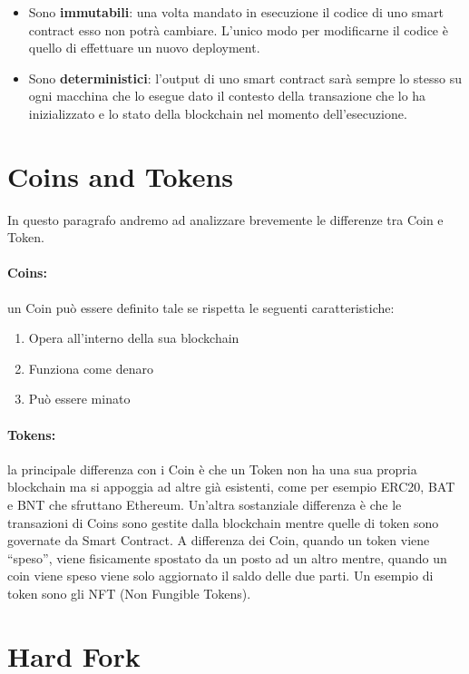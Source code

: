 \vspace{-0.5em}

\begin{itemize}
      \item Sono \textbf{immutabili}: una volta mandato in esecuzione il codice di uno smart contract esso non potrà cambiare. L'unico modo per modificarne il codice è quello di  effettuare un nuovo deployment.
      \item Sono \textbf{deterministici}: l'output di uno smart contract sarà sempre lo stesso su ogni macchina che lo esegue dato il contesto della transazione che lo ha inizializzato e lo stato della blockchain nel momento dell'esecuzione.
\end{itemize}

\section{Coins and Tokens}
In questo paragrafo andremo ad analizzare brevemente le differenze tra Coin e Token.

\paragraph{Coins:} un Coin può essere definito tale se rispetta le seguenti caratteristiche:

\begin{enumerate}
      \item Opera all'interno della sua blockchain
      \item Funziona come denaro
      \item Può essere minato
\end{enumerate}

\paragraph{Tokens:}
la principale differenza con i Coin è che un Token non ha una sua propria blockchain ma si appoggia ad altre già esistenti, come per esempio ERC20, BAT e BNT che sfruttano Ethereum. Un'altra sostanziale differenza è che le transazioni di Coins sono gestite dalla blockchain mentre quelle di token sono governate da Smart Contract.
A differenza dei Coin, quando un token viene ``speso'', viene fisicamente spostato da un posto ad un altro mentre, quando un coin viene speso viene solo aggiornato il saldo delle due parti. Un esempio di token sono gli NFT (Non Fungible Tokens).

\section{Hard Fork}

